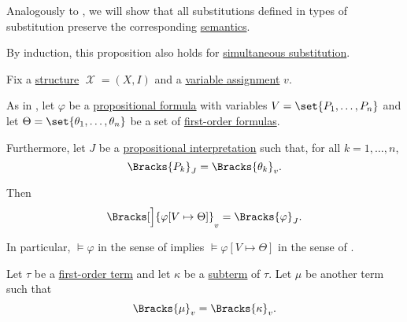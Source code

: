 \begin{proposition}\label{thm:first_order_substitution_equivalence}
  Analogously to , we will show that all substitutions defined in  types of substitution preserve the corresponding \hyperref[def:first_order_semantics]{semantics}.

  By induction, this proposition also holds for \hyperref[def:propositional_substitution/simultaneous]{simultaneous substitution}.

  Fix a \hyperref[def:first_order_structure]{structure} \( \mscrX = (X, I) \) and a \hyperref[def:first_order_valuation/variable_assignment]{variable assignment} \( v \).

  \begin{thmenum}
     As in , let \( \varphi \) be a \hyperref[def:propositional_syntax/formula]{propositional formula} with variables \( {V = \set{ P_1, \ldots, P_n }} \) and let \( \Theta = \set{ \theta_1, \ldots, \theta_n } \) be a set of \hyperref[def:first_order_syntax/formula]{first-order formulas}.

    Furthermore, let \( J \) be a \hyperref[def:propositional_valuation/interpretation]{propositional interpretation} such that, for all \( k = 1, \ldots, n \),
    \begin{equation}\label{eq:thm:first_order_substitution_equivalence/propositional/compatibility}
      \Bracks{P_k}_J = \Bracks{\theta_k}_v.
    \end{equation}

    Then
    \begin{equation}\label{eq:thm:first_order_substitution_equivalence/propositional}
      \Bracks[\Big]{ \varphi[V \mapsto \Theta] }_v = \Bracks{\varphi}_J.
    \end{equation}

    In particular, \( \vDash \varphi \) in the sense of  implies \( \vDash \varphi[V \mapsto \Theta] \) in the sense of .

     Let \( \tau \) be a \hyperref[def:first_order_syntax/term]{first-order term} and let \( \kappa \) be a \hyperref[def:first_order_syntax/subterm]{subterm} of \( \tau \). Let \( \mu \) be another term such that
    \begin{equation}\label{eq:thm:first_order_substitution_equivalence/term_in_term/compatibility}
      \Bracks{\mu}_v = \Bracks{\kappa}_v.
    \end{equation}


\end{thmenum}
\end{proposition}

